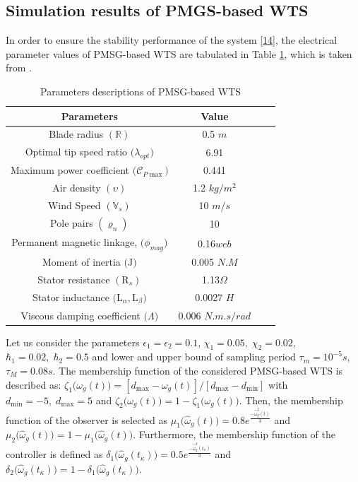 \documentclass[preprint,11pt]{elsarticle}
\begin{document}
\subsection{Simulation results of PMGS-based WTS}
In order to ensure the stability performance of the system \eqref{14}, the electrical parameter values of PMSG-based WTS are tabulated in Table \ref{Table-2}, which is taken from \cite{sub1}.
\begin{table}[!ht]
\centering
\caption{Parameters descriptions of PMSG-based WTS \cite{sub1}}
\vspace{-0.3cm}
\begin{center}
\label{Table-2}
\begin{tabular}{|c|c|c|c}   \hline
Parameters & Value\\\hline
Blade radius $(\mathbb{R})$ & 0.5 $m$\\
\hline
Optimal tip speed ratio $\big(\mathfrak{\lambda}_{opt}\big)$ & 6.91\\
\hline
Maximum power coefficient $\big(\mathcal{C}_{P\max}\big)$& 0.441\\
\hline
Air density $(\upsilon)$ & 1.2 \;$kg/m^{2}$ \\
\hline
Wind Speed $(\mathbb{V}_{s})$ &  10 $m /s$\\
\hline
Pole pairs $(\varrho_n)$& 10\\
\hline
Permanent magnetic linkage, $\big(\phi_{mag}\big)$ & 0.16$web$\\
\hline
Moment of inertia $\big(\mathrm{J}\big)$ & 0.005 $N.M$\\
\hline
Stator resistance $(\mathrm{R}_s)$& 1.13$\Omega$\\
\hline
Stator inductance $\big(\mathrm{L}_{\alpha},\mathrm{L}_{\beta}\big)$ & 0.0027 \;$H$ \\
\hline
Viscous damping coefficient $\big(\Lambda\big)$ & 0.006 $N.m.s/rad$\\
\hline
\end{tabular}
\end{center}
\vspace{-0.3cm}
\end{table}
Let us consider the parameters $\epsilon_1=\epsilon_2=0.1$, $\chi_1=0.05,\;\chi_2=0.02$, $\hbar_1=0.02,\;\hbar_2=0.5$ and lower and upper bound of sampling period $\tau_m=10^{-5}s$, $\tau_M=0.08s$. The membership function of the considered PMSG-based WTS is described as: $\zeta_1\big( \omega_g(t) \big)=[d_{\max}-\omega_g(t)]/[d_{\max}-d_{\min}]$ with $d_{\min}=-5,\;d_{\max}=5$ and $\zeta_2\big( \omega_g(t) \big)=1-\zeta_1\big( \omega_g(t) \big)$. {Then, the membership function of the observer is selected as
$\mu_1\big( \hat{\omega}_g(t) \big)=0.8e^{\frac{-\hat{\omega}^2_g(t)}{3}}$ and $\mu_2\big( \hat{\omega}_g(t) \big)=1-\mu_1\big( \hat{\omega}_g(t) \big)$.
Furthermore, the membership function of the controller is defined as $\delta_1\big( \hat{\omega}_g(t_\kappa) \big)=0.5e^{\frac{-\hat{\omega}^2_g(t_\kappa)}{3}}$ and $\delta_2\big( \hat{\omega}_g(t_\kappa) \big)=1-\delta_1\big( \hat{\omega}_g(t_\kappa) \big)$.}
\end{document}
